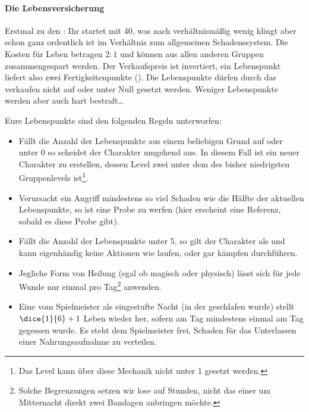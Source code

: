 \paragraph{Die Lebensversicherung}
\begin{wrapfigure}[4]{r}{0.375\linewidth}
    \vspace*{-0.75\topsep}\centering{}
\end{wrapfigure}
Erstmal zu den : 
Ihr startet mit 40, was nach verhältnismäßig wenig klingt aber schon ganz ordentlich ist im Verhältnis zum allgemeinen Schadenssystem. %
Die Kosten für Leben betragen \(2:1\) und können aus allen anderen Gruppen zusammengespart werden. Der Verkaufspreis ist invertiert, ein Lebenspunkt liefert also zwei Fertigkeitenpunkte (\SP).
Die Lebenspunkte dürfen durch das verkaufen nicht auf oder unter Null gesetzt werden. Weniger Lebenspunkte werden aber auch hart bestraft\ldots

Eure Lebenspunkte sind den folgenden Regeln unterworfen:
\begin{itemize}
    \item \label{char:createNew}Fällt die Anzahl der Lebenspunkte aus einem beliebigen Grund auf oder unter \(0\) so scheidet der Charakter umgehend aus. In diesem Fall ist ein neuer Charakter zu erstellen, dessen Level zwei unter dem des bisher niedrigsten Gruppenlevels ist\footnote{Das Level kann über diese Mechanik nicht unter 1 gesetzt werden.}.
    \item Verursacht ein Angriff mindestens so viel Schaden wie die Hälfte der aktuellen Lebenspunkte, so ist eine Probe zu werfen (hier erscheint eine Referenz, sobald es diese Probe gibt). %
    \item Fällt die Anzahl der Lebenspunkte unter 5, so gilt der Charakter als  und kann eigenhändig keine Aktionen wie laufen, oder gar kämpfen durchführen.
    \item Jegliche Form von Heilung (egal ob magisch oder physisch) lässt sich für jede Wunde nur einmal pro Tag\footnote{Solche Begrenzungen setzen wir lose auf  Stunden, nicht das einer um Mitternacht direkt zwei Bandagen anbringen möchte.} anwenden.
    \item {}Eine vom Spielmeister als  eingestufte Nacht (in der geschlafen wurde) stellt \(\dice{1}{6} + 1\) Leben wieder her, sofern am Tag mindestens einmal am Tag gegessen wurde. Es steht dem Spielmeister frei, Schaden für das Unterlassen einer Nahrungsaufnahme zu verteilen.
\end{itemize}

